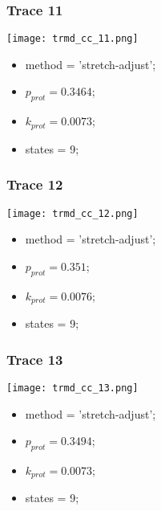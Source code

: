 \subsubsection{Trace 11}
\begin{minipage}[c]{0.7\textwidth}
	\texttt{[image: trmd\_cc\_11.png]}
\end{minipage}
\hfill
\begin{minipage}[c]{0.45\textwidth}
	\begin{itemize}
		\item method = 'stretch-adjust';
		\item $p_{prot}=0.3464$;
		\item $k_{prot}=0.0073$;
		\item states = 9;
	\end{itemize}
\end{minipage}

\subsubsection{Trace 12}
\begin{minipage}[c]{0.7\textwidth}
	\texttt{[image: trmd\_cc\_12.png]}
\end{minipage}
\hfill
\begin{minipage}[c]{0.45\textwidth}
	\begin{itemize}
		\item method = 'stretch-adjust';
		\item $p_{prot}=0.351$;
		\item $k_{prot}=0.0076$;
		\item states = 9;
	\end{itemize}
\end{minipage}

\subsubsection{Trace 13}
\begin{minipage}[c]{0.7\textwidth}
	\texttt{[image: trmd\_cc\_13.png]}
\end{minipage}
\hfill
\begin{minipage}[c]{0.45\textwidth}
	\begin{itemize}
		\item method = 'stretch-adjust';
		\item $p_{prot}=0.3494$;
		\item $k_{prot}=0.0073$;
		\item states = 9;
	\end{itemize}
\end{minipage}

